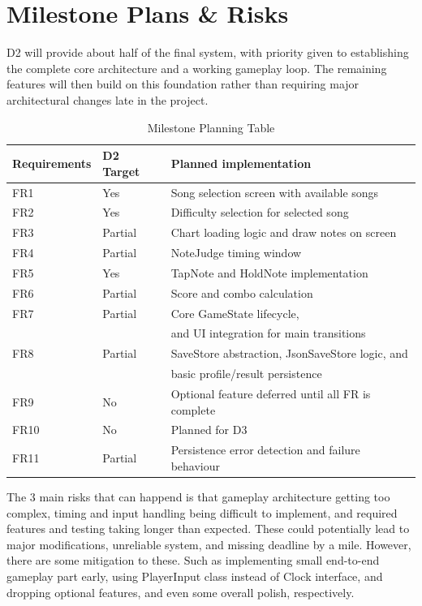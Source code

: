 \documentclass[12pt,a4paper]{article}
\newcommand\tab[1][1cm]{\hspace*{#1}}
\begin{document}
\section{Milestone Plans \& Risks}
    \tab D2 will provide about half of the final system, with priority given to establishing the complete core architecture and a working gameplay loop.
    The remaining features will then build on this foundation rather than requiring major architectural changes late in the project.
    \begin{table}[H]
        \centering
        \begin{tabular}{@{}lll@{}}
            \toprule
            Requirements & D2 Target & Planned implementation \\ 
            \midrule
            FR1  & Yes     & Song selection screen with available songs \\
            FR2  & Yes     & Difficulty selection for selected song \\
            FR3  & Partial & Chart loading logic and draw notes on screen \\
            FR4  & Partial & NoteJudge timing window \\
            FR5  & Yes     & TapNote and HoldNote implementation \\
            FR6  & Partial & Score and combo calculation \\
            FR7  & Partial & Core GameState lifecycle, \\
                 &         & and UI integration for main transitions \\
            FR8  & Partial & SaveStore abstraction, JsonSaveStore logic, and \\ 
                 &         & basic profile/result persistence \\
            FR9  & No      & Optional feature deferred until all FR is complete \\
            FR10 & No      & Planned for D3 \\
            FR11 & Partial & Persistence error detection and failure behaviour \\
            \bottomrule
        \end{tabular}
        \caption{Milestone Planning Table}
    \end{table}
    \tab The 3 main risks that can happend is that 
    gameplay architecture getting too complex, timing and input handling being difficult to implement,
    and required features and testing taking longer than expected.
    These could potentially lead to major modifications, unreliable system, and missing deadline by a mile.
    However, there are some mitigation to these. Such as implementing small end-to-end gameplay part early, using PlayerInput class instead of Clock interface, and dropping optional features, and even some overall polish, respectively.
\end{document}
